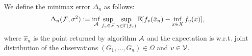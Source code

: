 We define the minimax error $\Delta_n$ as follows:
\begin{align}
  \label{eq:minimax-err}
  \Delta_n(\mathcal{F}, \sigma^2) := \inf_{\mathcal{A}} \sup_{f_v \in \mathcal{F}} \sup_{\gamma \in \Gamma(f_v)} \mathbb{E}[f_v(\hat x_n) - \inf_{x \in X}
  f_v(x)],
\end{align}
where $\hat x_n$ is the point returned by algorithm $\mathcal{A}$ and 
the expectation is w.r.t. joint distribution  of the observations $(G_1, \ldots,
G_n) \in \Omega$ and $v \in \mathcal{V}$.
